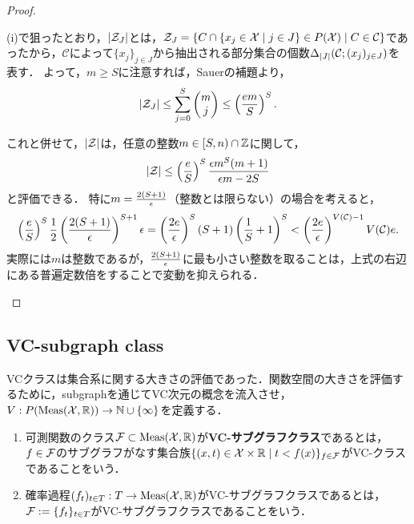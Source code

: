 \documentclass[uplatex,dvipdfmx]{jsreport}
\renewcommand{\C}{\mathcal{C}}
\begin{document}
\begin{proof}
\begin{description}
\begin{enumerate}[(i)]
            (i)で狙ったとおり，$\lvert\mathcal{Z}_J\rvert$とは，$\cZ_J=\Brace{C\cap\Brace{x_j\in\X\mid j\in J}\in P(\X)\mid C\in\C}$であったから，$\C$によって$\{x_j\}_{j\in J}$から抽出される部分集合の個数$\Delta_{\abs{J}}(\C;(x_j)_{j\in J})$を表す．
            よって，$m\ge S$に注意すれば，Sauerの補題より，
            \[\lvert\mathcal{Z}_J\rvert\le\sum^S_{j=0}\begin{pmatrix}m\\j\end{pmatrix}\le\left(\frac{em}{S}\right)^S.\]
            
            これと併せて，$\lvert\mathcal{Z}\rvert$は，任意の整数$m\in[S,n)\cap\mathbb{Z}$に関して，
            \[\lvert\mathcal{Z}\rvert\le\left(\frac{e}{S}\right)^S\frac{\epsilon m^S(m+1)}{\epsilon m-2S}\]
            と評価できる．
            特に$m=\frac{2(S+1)}{\epsilon}$（整数とは限らない）の場合を考えると，
            \[\paren{\frac{e}{S}}^S\frac{1}{2}\paren{\frac{2(S+1)}{\ep}}^{S+1}\ep=\paren{\frac{2e}{\ep}}^S(S+1)\paren{\frac{1}{S}+1}^S<\paren{\frac{2e}{\ep}}^{V(\C)-1}V(\C)e.\]
            実際には$m$は整数であるが，$\frac{2(S+1)}{\epsilon}$に最も小さい整数を取ることは，上式の右辺にある普遍定数倍をすることで変動を抑えられる．
        \end{enumerate}
    \end{description}
\end{proof}

\subsection{VC-subgraph class}

\begin{tcolorbox}[colframe=ForestGreen, colback=ForestGreen!10!white,breakable,colbacktitle=ForestGreen!40!white,coltitle=black,fonttitle=\bfseries\sffamily,
title=]
    VCクラスは集合系に関する大きさの評価であった．関数空間の大きさを評価するために，subgraphを通じてVC次元の概念を流入させ，$V:P(\mathrm{Meas}(\mathcal{X},\mathbb{R}))\to\mathbb{N}\cup\{\infty\}$を定義する．
\end{tcolorbox}

\begin{definition}\mbox{}
    \begin{enumerate}
        \item 可測関数のクラス$\mathcal{F}\subset\mathrm{Meas}(\mathcal{X},\mathbb{R})$が\textbf{VC-サブグラフクラス}であるとは，$f\in\mathcal{F}$のサブグラフがなす集合族$\{(x,t)\in\mathcal{X}\times\mathbb{R}\mid t<f(x)\}_{f\in\mathcal{F}}$がVC-クラスであることをいう．
        \item 確率過程$(f_t)_{t\in T}:T\to\mathrm{Meas}(\mathcal{X},\mathbb{R})$がVC-サブグラフクラスであるとは，$\mathcal{F}:=\{f_t\}_{t\in T}$がVC-サブグラフクラスであることをいう．
    \end{enumerate}
\end{definition}
\end{document}
